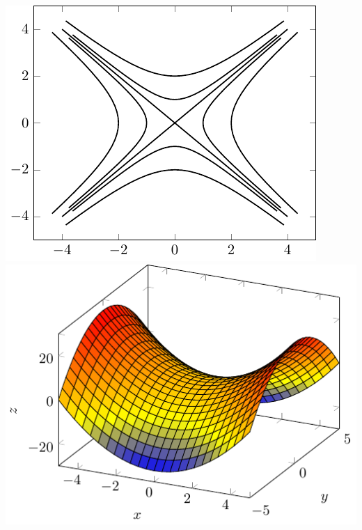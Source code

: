 \includegraphics[scale=1]{tikz-pictures/section-9.1-again-pic5-hyperbolic-paraboloid-1.pdf}
\includegraphics[scale=1]{tikz-pictures/section-9.1-again-pic5-hyperbolic-paraboloid-2.pdf}\label{img:tikz-saddle}

